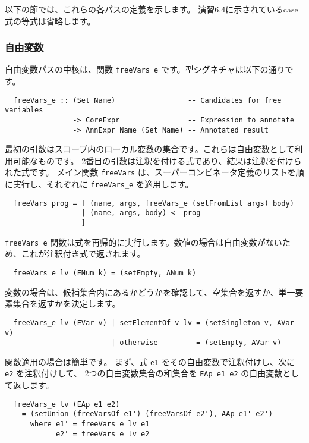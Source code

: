 \documentclass{jarticle}
\begin{document}
以下の節では、これらの各パスの定義を示します。
演習6.4に示されているcase式の等式は省略します。

\subsubsection{自由変数}

自由変数パスの中核は、関数 \texttt{freeVars\_e} です。型シグネチャは以下の通りです。

\begin{verbatim}
  freeVars_e :: (Set Name)                 -- Candidates for free variables
                -> CoreExpr                -- Expression to annotate
                -> AnnExpr Name (Set Name) -- Annotated result
\end{verbatim}

最初の引数はスコープ内のローカル変数の集合です。これらは自由変数として利用可能なものです。
2番目の引数は注釈を付ける式であり、結果は注釈を付けられた式です。
メイン関数 \texttt{freeVars} は、スーパーコンビネータ定義のリストを順に実行し、それぞれに \texttt{freeVars\_e} を適用します。

\begin{verbatim}
  freeVars prog = [ (name, args, freeVars_e (setFromList args) body)
                  | (name, args, body) <- prog
                  ]
\end{verbatim}

\texttt{freeVars\_e} 関数は式を再帰的に実行します。数値の場合は自由変数がないため、これが注釈付き式で返されます。

\begin{verbatim}
  freeVars_e lv (ENum k) = (setEmpty, ANum k)
\end{verbatim}

変数の場合は、候補集合内にあるかどうかを確認して、空集合を返すか、単一要素集合を返すかを決定します。

\begin{verbatim}
  freeVars_e lv (EVar v) | setElementOf v lv = (setSingleton v, AVar v)
                         | otherwise         = (setEmpty, AVar v)
\end{verbatim}

関数適用の場合は簡単です。
まず、式 \texttt{e1} をその自由変数で注釈付けし、次に \texttt{e2} を注釈付けして、
2つの自由変数集合の和集合を \texttt{EAp e1 e2} の自由変数として返します。

\begin{verbatim}
  freeVars_e lv (EAp e1 e2)
    = (setUnion (freeVarsOf e1') (freeVarsOf e2'), AAp e1' e2')
      where e1' = freeVars_e lv e1
            e2' = freeVars_e lv e2
\end{verbatim}
\end{document}
